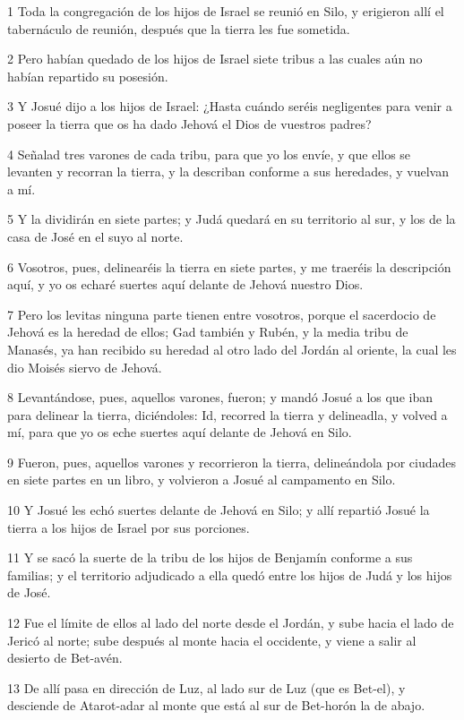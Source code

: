 \par 1 Toda la congregación de los hijos de Israel se reunió en Silo, y erigieron allí el tabernáculo de reunión, después que la tierra les fue sometida.
\par 2 Pero habían quedado de los hijos de Israel siete tribus a las cuales aún no habían repartido su posesión.
\par 3 Y Josué dijo a los hijos de Israel: ¿Hasta cuándo seréis negligentes para venir a poseer la tierra que os ha dado Jehová el Dios de vuestros padres?
\par 4 Señalad tres varones de cada tribu, para que yo los envíe, y que ellos se levanten y recorran la tierra, y la describan conforme a sus heredades, y vuelvan a mí.
\par 5 Y la dividirán en siete partes; y Judá quedará en su territorio al sur, y los de la casa de José en el suyo al norte.
\par 6 Vosotros, pues, delinearéis la tierra en siete partes, y me traeréis la descripción aquí, y yo os echaré suertes aquí delante de Jehová nuestro Dios.
\par 7 Pero los levitas ninguna parte tienen entre vosotros, porque el sacerdocio de Jehová es la heredad de ellos; Gad también y Rubén, y la media tribu de Manasés, ya han recibido su heredad al otro lado del Jordán al oriente, la cual les dio Moisés siervo de Jehová.
\par 8 Levantándose, pues, aquellos varones, fueron; y mandó Josué a los que iban para delinear la tierra, diciéndoles: Id, recorred la tierra y delineadla, y volved a mí, para que yo os eche suertes aquí delante de Jehová en Silo.
\par 9 Fueron, pues, aquellos varones y recorrieron la tierra, delineándola por ciudades en siete partes en un libro, y volvieron a Josué al campamento en Silo.
\par 10 Y Josué les echó suertes delante de Jehová en Silo; y allí repartió Josué la tierra a los hijos de Israel por sus porciones.
\par 11 Y se sacó la suerte de la tribu de los hijos de Benjamín conforme a sus familias; y el territorio adjudicado a ella quedó entre los hijos de Judá y los hijos de José.
\par 12 Fue el límite de ellos al lado del norte desde el Jordán, y sube hacia el lado de Jericó al norte; sube después al monte hacia el occidente, y viene a salir al desierto de Bet-avén.
\par 13 De allí pasa en dirección de Luz, al lado sur de Luz (que es Bet-el), y desciende de Atarot-adar al monte que está al sur de Bet-horón la de abajo.
